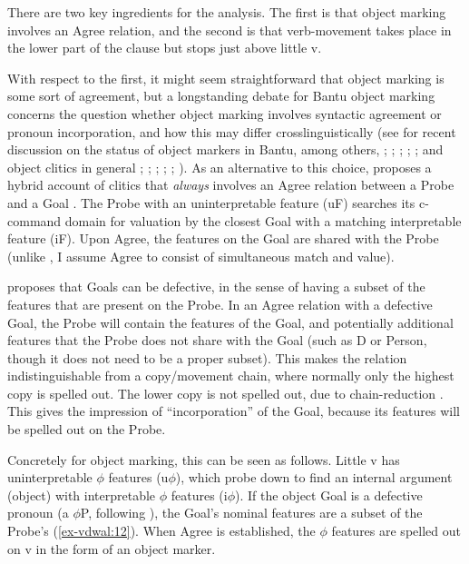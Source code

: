 \documentclass[output=paper
,modfonts
,nonflat]{langsci/langscibook}
\begin{document}
There are two key ingredients for the analysis. The first is that object marking involves an Agree relation, and the second is that verb-movement takes place in the lower part of the clause but stops just above little v.

With respect to the first, it might seem straightforward that object marking is some sort of agreement, but a longstanding debate for Bantu object marking concerns the question whether object marking involves syntactic agreement or pronoun incorporation, and how this may differ crosslinguistically (see for recent discussion on the status of object markers in Bantu, among others, \citealt{Henderson2006}; \citealt{Riedel2009}; \citealt{Zeller2012}; \citealt{Iorio2014}; \citealt{Baker2016}; and object clitics in general \citealt{Preminger2009}; \citealt{Nevins2011}; \citealt{Anagnostopoulou2014, Anagnostopoulou2016}; \citealt{Kramer2014}; \citealt{Harizanov2014}; \citealt{Baker_Kramer2016}). As an alternative to this choice, \citet{Roberts2010} proposes a hybrid account of clitics that \textit{always} involves an Agree relation between a Probe and a Goal \citep{Chomsky2000, Chomsky2001}. The Probe with an uninterpretable feature (uF) searches its c-command domain for valuation by the closest Goal with a matching interpretable feature (iF). Upon Agree, the features on the Goal are shared with the Probe (unlike , I assume Agree to consist of simultaneous match and value).

\citet{Roberts2010} proposes that Goals can be defective, in the sense of having a subset of the features that are present on the Probe. In an Agree relation with a defective Goal, the Probe will contain the features of the Goal, and potentially additional features that the Probe does not share with the Goal (such as D or Person, though it does not need to be a proper subset). This makes the relation indistinguishable from a copy/movement chain, where normally only the highest copy is spelled out. The lower copy is not spelled out, due to chain-reduction \citep{Nunes2004}. This gives the impression of “incorporation” of the Goal, because its features will be spelled out on the Probe.

Concretely for object marking, this can be seen as follows. Little v has uninterpretable $\phi $ features (u$\phi$), which probe down to find an internal argument (object) with interpretable $\phi$ features (i$\phi$). If the object Goal is a defective pronoun (a $\phi$P, following \citealt{Dechaine_Wiltschko2002}), the Goal’s nominal features are a subset of the Probe’s (\ref{ex-vdwal:12}). When Agree is established, the $\phi$ features are spelled out on v in the form of an object marker.
\end{document}
